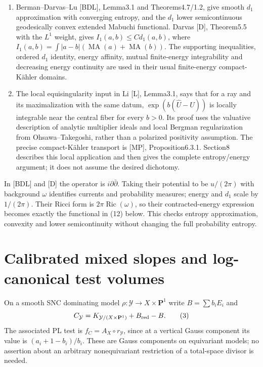 \documentclass[11pt]{article}
\newcommand{\MA}{\operatorname{MA}}
\newcommand{\Ric}{\operatorname{Ric}}
\begin{document}
\begin{enumerate}
regularity statement, not its printed time-dependent slope constant.
Section4 proves the model entropy slope directly.
\item Berman--Darvas--Lu [BDL], Lemma3.1 and Theorems4.7/1.2,
give smooth $d_1$ approximation with converging entropy, and the
$d_1$ lower semicontinuous geodesically convex extended Mabuchi
functional. Darvas [D], Theorem5.5 with the $L^1$ weight, gives
$I_1(a,b)\leq C d_1(a,b)$, where
$I_1(a,b)=\int|a-b|(\MA(a)+\MA(b))$.
The supporting inequalities, ordered $d_1$ identity, energy affinity,
mutual finite-energy integrability and decreasing energy continuity
are used in their usual finite-energy compact-K\"ahler domains.
\item The local equisingularity input in Li [L], Lemma3.1, says that
for a ray and its maximalization with the same datum,
$\exp(b(\widehat U-U))$ is locally integrable near the central fiber
for every $b>0$. Its proof uses the valuative description of analytic
multiplier ideals and local Bergman regularization from
Ohsawa--Takegoshi, rather than a polarized positivity assumption.
The precise compact-K\"ahler transport is [MP], Proposition6.3.1.
Section8 describes this local application and then gives the complete
entropy/energy argument; it does not assume the desired dichotomy.
\end{enumerate}
In [BDL] and [D] the operator is $i\partial\bar\partial$.
Taking their potential to be $u/(2\pi)$ with background $\omega$
identifies currents and probability measures; energy and $d_1$ scale
by $1/(2\pi)$. Their Ricci form is $2\pi\Ric(\omega)$, so their
contracted-energy expression becomes exactly the functional in (12)
below. This checks entropy approximation, convexity and lower
semicontinuity without changing the full probability entropy.

\section{Calibrated mixed slopes and log-canonical test volumes}
On a smooth SNC dominating model $\rho:\mathcal Y\to X\times\mathbf P^1$
write $B=\sum b_iE_i$ and
\[
 C_{\mathcal Y}=K_{\mathcal Y/(X\times\mathbf P^1)}+B_{\rm red}-B.
                                                               \tag{3}
\]
The associated PL test is
$f_C=A_X\circ r_{\mathcal Y}$, since at a vertical Gauss component
its value is $(a_i+1-b_i)/b_i$. These are Gauss components on
equivariant models; no assertion about an arbitrary nonequivariant
restriction of a total-space divisor is needed.
\end{document}
